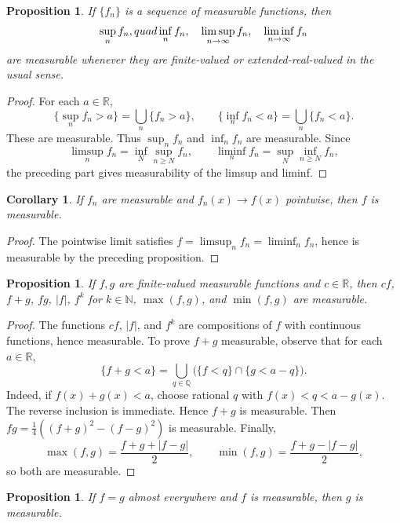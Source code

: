 \documentclass[11pt,openany]{book}
\numberwithin{equation}{chapter}
\theoremstyle{definition}
\theoremstyle{plain}
\newtheorem{proposition}[definition]{Proposition}
\newtheorem{corollary}[definition]{Corollary}
\theoremstyle{remark}
\newcommand{\R}{\mathbb{R}}
\newcommand{\N}{\mathbb{N}}
\newcommand{\Q}{\mathbb{Q}}
\newcommand{\1}{\mathbf{1}}
\newcommand{\abs}[1]{\left\lvert #1\right\rvert}
\begin{document}
\begin{proposition}
If \(\{f_n\}\) is a sequence of measurable functions, then
\[
    \sup_n f_n,\\quad \inf_n f_n,\quad \limsup_{n\to\infty}f_n,\quad \liminf_{n\to\infty}f_n
\]
are measurable whenever they are finite-valued or extended-real-valued in the usual sense.
\end{proposition}

\begin{proof}
For each \(a\in\R\),
\[
    \{\sup_n f_n>a\}=\bigcup_n\{f_n>a\},\qquad
    \{\inf_n f_n<a\}=\bigcup_n\{f_n<a\}.
\]
These are measurable.  Thus \(\sup_n f_n\) and \(\inf_nf_n\) are measurable.  Since
\[
    \limsup_n f_n=\inf_N\sup_{n\ge N}f_n,
    \qquad
    \liminf_n f_n=\sup_N\inf_{n\ge N}f_n,
\]
the preceding part gives measurability of the limsup and liminf.
\end{proof}

\begin{corollary}
If \(f_n\) are measurable and \(f_n(x)\to f(x)\) pointwise, then \(f\) is measurable.
\end{corollary}

\begin{proof}
The pointwise limit satisfies \(f=\limsup_n f_n=\liminf_n f_n\), hence is measurable by the preceding proposition.
\end{proof}

\begin{proposition}
If \(f,g\) are finite-valued measurable functions and \(c\in\R\), then \(cf\), \(f+g\), \(fg\), \(\abs{f}\), \(f^k\) for \(k\in\N\), \(\max(f,g)\), and \(\min(f,g)\) are measurable.
\end{proposition}

\begin{proof}
The functions \(cf\), \(\abs f\), and \(f^k\) are compositions of \(f\) with continuous functions, hence measurable.  To prove \(f+g\) measurable, observe that for each \(a\in\R\),
\[
    \{f+g<a\}
    =\bigcup_{q\in\Q}\bigl(\{f<q\}\cap\{g<a-q\}\bigr).
\]
Indeed, if \(f(x)+g(x)<a\), choose rational \(q\) with \(f(x)<q<a-g(x)\).  The reverse inclusion is immediate.  Hence \(f+g\) is measurable.  Then \(fg=\frac14((f+g)^2-(f-g)^2)\) is measurable.  Finally,
\[
    \max(f,g)=\frac{f+g+\abs{f-g}}2,
    \qquad
    \min(f,g)=\frac{f+g-\abs{f-g}}2,
\]
so both are measurable.
\end{proof}

\begin{proposition}
If \(f=g\) almost everywhere and \(f\) is measurable, then \(g\) is measurable.
\end{proposition}
\end{document}
